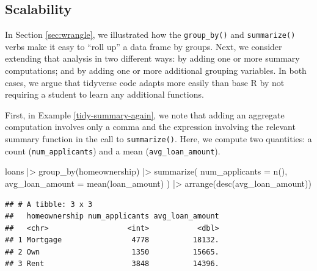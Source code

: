 \documentclass[12pt]{article}
\newenvironment{Shaded}{\begin{snugshade}}{\end{snugshade}}
\newcommand{\AttributeTok}[1]{\textcolor[rgb]{0.77,0.63,0.00}{#1}}
\newcommand{\FunctionTok}[1]{\textcolor[rgb]{0.00,0.00,0.00}{#1}}
\newcommand{\NormalTok}[1]{#1}
\newcommand{\SpecialCharTok}[1]{\textcolor[rgb]{0.00,0.00,0.00}{#1}}
\begin{document}
\hypertarget{sec:scalability}{%
\subsection{Scalability}\label{sec:scalability}}

In Section \ref{sec:wrangle}, we illustrated how the
\texttt{group\_by()} and \texttt{summarize()} verbs make it easy to
``roll up'' a data frame by groups. Next, we consider extending that
analysis in two different ways: by adding one or more summary
computations; and by adding one or more additional grouping variables.
In both cases, we argue that tidyverse code adapts more easily than base
R by not requiring a student to learn any additional functions.

First, in Example \ref{tidy-summary-again}, we note that adding an
aggregate computation involves only a comma and the expression involving
the relevant summary function in the call to \texttt{summarize()}. Here,
we compute two quantities: a count (\texttt{num\_applicants}) and a mean
(\texttt{avg\_loan\_amount}).

\linespread{1}

\begin{Shaded}
\begin{Highlighting}[]
\NormalTok{loans }\SpecialCharTok{|\textgreater{}}
  \FunctionTok{group\_by}\NormalTok{(homeownership) }\SpecialCharTok{|\textgreater{}}
  \FunctionTok{summarize}\NormalTok{(}
    \AttributeTok{num\_applicants =} \FunctionTok{n}\NormalTok{(),}
    \AttributeTok{avg\_loan\_amount =} \FunctionTok{mean}\NormalTok{(loan\_amount)}
\NormalTok{  ) }\SpecialCharTok{|\textgreater{}}
  \FunctionTok{arrange}\NormalTok{(}\FunctionTok{desc}\NormalTok{(avg\_loan\_amount))}
\end{Highlighting}
\end{Shaded}

\begin{verbatim}
## # A tibble: 3 x 3
##   homeownership num_applicants avg_loan_amount
##   <chr>                  <int>           <dbl>
## 1 Mortgage                4778          18132.
## 2 Own                     1350          15665.
## 3 Rent                    3848          14396.
\end{verbatim}


\label{tidy-summary-again} \linespread{2}
\vspace{3mm}\setlength{\parindent}{15pt}
\end{document}
